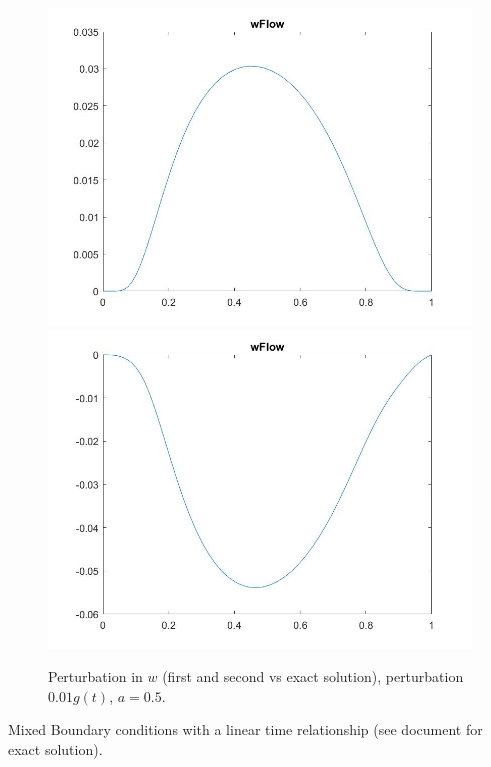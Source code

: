 \documentclass[11pt, a4paper]{article}
\theoremstyle{definition}
\begin{document}
\begin{figure}[h]
	\includegraphics[scale=0.25]{wpert1.jpg}
	\includegraphics[scale=0.25]{wpert2.jpg}
	\caption{Perturbation in $w$ (first and second vs exact solution), perturbation $0.01g(t)$, $a=0.5$.}
	\label{FigKal3}
\end{figure}



Mixed Boundary conditions with a linear time relationship (see document for exact solution).
\end{document}
